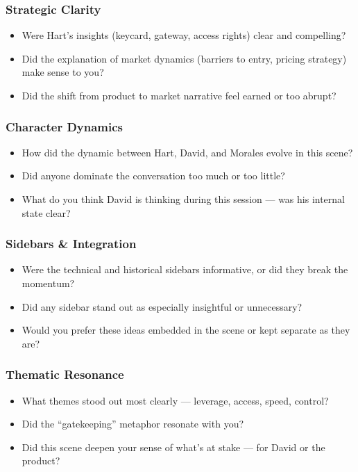 \subsubsection{Strategic Clarity}

\begin{itemize}
  \item Were Hart’s insights (keycard, gateway, access rights) clear and compelling?
  \item Did the explanation of market dynamics (barriers to entry, pricing strategy) make sense to you?
  \item Did the shift from product to market narrative feel earned or too abrupt?
\end{itemize}

\subsubsection{Character Dynamics}

\begin{itemize}
  \item How did the dynamic between Hart, David, and Morales evolve in this scene?
  \item Did anyone dominate the conversation too much or too little?
  \item What do you think David is thinking during this session — was his internal state clear?
\end{itemize}

\subsubsection{Sidebars \& Integration}

\begin{itemize}
  \item Were the technical and historical sidebars informative, or did they break the momentum?
  \item Did any sidebar stand out as especially insightful or unnecessary?
  \item Would you prefer these ideas embedded in the scene or kept separate as they are?
\end{itemize}

\subsubsection{Thematic Resonance}

\begin{itemize}
  \item What themes stood out most clearly — leverage, access, speed, control?
  \item Did the “gatekeeping” metaphor resonate with you?
  \item Did this scene deepen your sense of what’s at stake — for David or the product?
\end{itemize}

